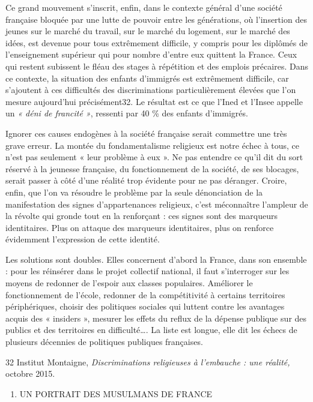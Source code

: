 Ce grand mouvement s'inscrit, enfin, dans le contexte général d'une
société française bloquée par une lutte de pouvoir entre les
générations, où l'insertion des jeunes sur le marché du travail, sur le
marché du logement, sur le marché des idées, est devenue pour tous
extrêmement difficile, y compris pour les diplômés de l'enseignement
supérieur qui pour nombre d'entre eux quittent la France. Ceux qui
restent subissent le fléau des stages à répétition et des emplois
précaires. Dans ce contexte, la situation des enfants d'immigrés est
extrêmement difficile, car s'ajoutent à ces difficultés des
discriminations particulièrement élevées que l'on mesure aujourd'hui
précisément32. Le résultat est ce que l'Ined et l'Insee appelle un
\emph{« déni de francité »}, ressenti par 40 \% des enfants d'immigrés.

Ignorer ces causes endogènes à la société française serait commettre une
très grave erreur. La montée du fondamentalisme religieux est notre
échec à tous, ce n'est pas seulement « leur problème à eux ». Ne pas
entendre ce qu'il dit du sort réservé à la jeunesse française, du
fonctionnement de la société, de ses blocages, serait passer à côté
d'une réalité trop évidente pour ne pas déranger. Croire, enfin, que
l'on va résoudre le problème par la seule dénonciation de la
manifestation des signes d'appartenances religieux, c'est méconnaître
l'ampleur de la révolte qui gronde tout en la renforçant : ces signes
sont des marqueurs identitaires. Plus on attaque des marqueurs
identitaires, plus on renforce évidemment l'expression de cette
identité.

Les solutions sont doubles. Elles concernent d'abord la France, dans son
ensemble : pour les réinsérer dans le projet collectif national, il faut
s'interroger sur les moyens de redonner de l'espoir aux classes
populaires. Améliorer le fonctionnement de l'école, redonner de la
compétitivité à certains territoires périphériques, choisir des
politiques sociales qui luttent contre les avantages acquis des «
insiders », mesurer les effets du reflux de la dépense publique sur des
publics et des territoires en difficulté\ldots. La liste est longue,
elle dit les échecs de plusieurs décennies de politiques publiques
françaises.

32 Institut Montaigne, \emph{Discriminations religieuses à l'embauche :
une réalité,} octobre 2015.


\begin{enumerate}
\def\labelenumi{\Roman{enumi}.}
\item
  UN PORTRAIT DES MUSULMANS DE FRANCE
\end{enumerate}


